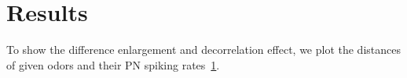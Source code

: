 \documentclass[12pt, a4paper]{article}
\begin{document}

\section{Results}



To show the difference enlargement and decorrelation effect, we plot the distances of given odors and their PN spiking rates~\ref{}.

\end{document}
